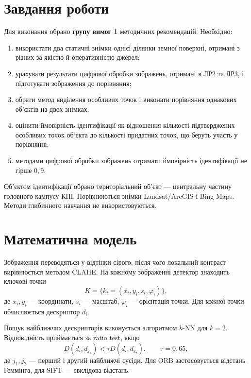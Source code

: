 \documentclass[12pt,a4paper]{article}
\begin{document}
\section{Завдання роботи}
Для виконання обрано \textbf{групу вимог 1} методичних рекомендацій. Необхідно:
\begin{enumerate}[leftmargin=*,itemsep=0.25em]
  \item використати два статичні знімки однієї ділянки земної поверхні, отримані з різних за якістю й оперативністю джерел;
  \item урахувати результати цифрової обробки зображень, отримані в ЛР2 та ЛР3, і підготувати зображення до порівняння;
  \item обрати метод виділення особливих точок і виконати порівняння однакових об'єктів на двох знімках;
  \item оцінити ймовірність ідентифікації як відношення кількості підтверджених особливих точок об'єкта до кількості придатних точок, що беруть участь у порівнянні;
  \item методами цифрової обробки зображень отримати ймовірність ідентифікації не гірше $0{,}9$.
\end{enumerate}

Об'єктом ідентифікації обрано територіальний об'єкт --- центральну частину головного кампусу КПІ. Порівнюються знімки Landsat/ArcGIS і Bing Maps. Методи глибинного навчання не використовуються.

\section{Математична модель}
Зображення переводяться у відтінки сірого, після чого локальний контраст вирівнюється методом CLAHE. На кожному зображенні детектор знаходить ключові точки
\begin{equation}
K=\{k_i=(x_i,y_i,s_i,\varphi_i)\},
\end{equation}
де $x_i,y_i$ --- координати, $s_i$ --- масштаб, $\varphi_i$ --- орієнтація точки. Для кожної точки обчислюється дескриптор $d_i$.

Пошук найближчих дескрипторів виконується алгоритмом $k$-NN для $k=2$. Відповідність приймається за ratio test, якщо
\begin{equation}
D(d_i,d_{j_1}) < \tau D(d_i,d_{j_2}),\qquad \tau=0{,}65,
\end{equation}
де $j_1,j_2$ --- перший і другий найближчі сусіди. Для ORB застосовується відстань Геммінга, для SIFT --- евклідова відстань.
\end{document}
